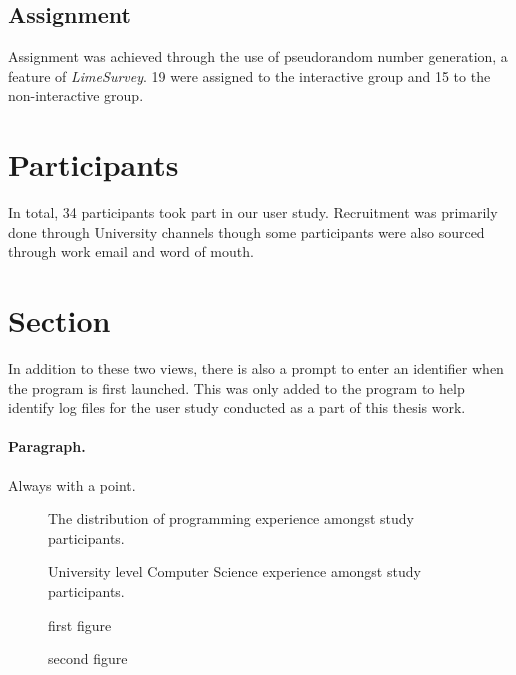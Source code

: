 \subsection{Assignment}

Assignment was achieved through the use of pseudorandom number generation, a
feature of \textit{LimeSurvey}. 19 were assigned to the interactive group and 15 to the non-interactive group.

\section{Participants}

In total, 34 participants took part in our user study. Recruitment was
primarily done through University channels though some participants were also
sourced through work email and word of mouth.


\section{Section} In addition to these two views, there is also a prompt to
enter an identifier when the program is first launched. This was only added to
the program to help identify log files for the user study conducted as a part
of this thesis work.

\paragraph{Paragraph.} Always with a point.


\begin{figure}[H]
	\centering
	\scalebox{0.75}{}
	\caption{The distribution of programming experience amongst study participants.}
	\label{fig:programmingexp}
\end{figure}

\begin{figure}[H]
	\centering
	\scalebox{0.8}{}
	\caption{University level Computer Science experience amongst study participants.}
	\label{fig:uniexp}
\end{figure}

\begin{figure}[H]
	\centering
	\begin{minipage}{0.45\textwidth}
		\centering
		\scalebox{0.7}{}
		\caption{first figure}
	\end{minipage}\hspace{-1em}
	\begin{minipage}{0.45\textwidth}
		\centering
		\scalebox{0.7}{}
		\caption{second figure}
	\end{minipage}
\end{figure}



